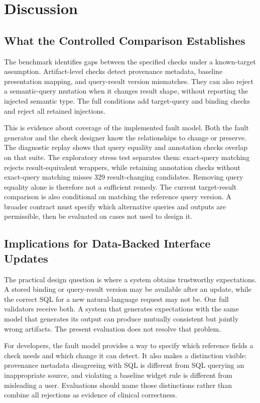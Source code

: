 \documentclass[manuscript,review,anonymous]{acmart}
\begin{document}
\section{Discussion}

\subsection{What the Controlled Comparison Establishes}

The benchmark identifies gaps between the specified checks under a known-target assumption. Artifact-level checks detect provenance metadata, baseline presentation mapping, and query-result version mismatches. They can also reject a semantic-query mutation when it changes result shape, without reporting the injected semantic type. The full conditions add target-query and binding checks and reject all retained injections.

This is evidence about coverage of the implemented fault model. Both the fault generator and the check designer know the relationships to change or preserve. The diagnostic replay shows that query equality and annotation checks overlap on that suite. The exploratory stress test separates them: exact-query matching rejects result-equivalent wrappers, while retaining annotation checks without exact-query matching misses 329 result-changing candidates. Removing query equality alone is therefore not a sufficient remedy. The current target-result comparison is also conditional on matching the reference query version. A broader contract must specify which alternative queries and outputs are permissible, then be evaluated on cases not used to design it.

\subsection{Implications for Data-Backed Interface Updates}

The practical design question is where a system obtains trustworthy expectations. A stored binding or query-result version may be available after an update, while the correct SQL for a new natural-language request may not be. Our full validators receive both. A system that generates expectations with the same model that generates its output can produce mutually consistent but jointly wrong artifacts. The present evaluation does not resolve that problem.

For developers, the fault model provides a way to specify which reference fields a check needs and which change it can detect. It also makes a distinction visible: provenance metadata disagreeing with SQL is different from SQL querying an inappropriate source, and violating a baseline widget rule is different from misleading a user. Evaluations should name those distinctions rather than combine all rejections as evidence of clinical correctness.
\end{document}
